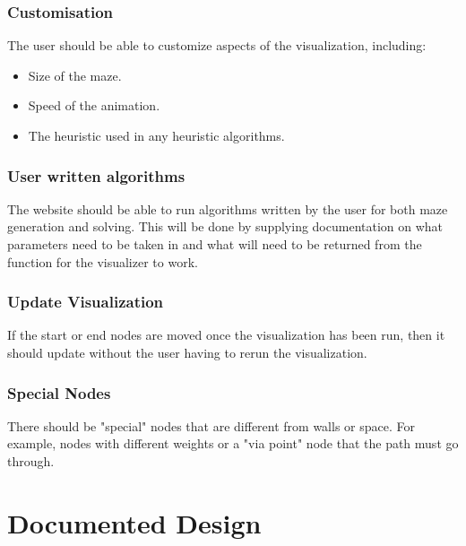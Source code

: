 \documentclass{article}
\begin{document}
\subsubsection{Customisation}
The user should be able to customize aspects of the visualization, including:
\begin{itemize}
    \item Size of the maze.
    \item Speed of the animation.
    \item The heuristic used in any heuristic algorithms.
\end{itemize}

\subsubsection{User written algorithms}
The website should be able to run algorithms written by the user for both maze generation and solving. This will be done by supplying documentation on what parameters need to be taken in and what will need to be returned from the function for the visualizer to work.

\subsubsection{Update Visualization}
If the start or end nodes are moved once the visualization has been run, then it should update without the user having to rerun the visualization.

\subsubsection{Special Nodes}
There should be "special" nodes that are different from walls or space. For example, nodes with different weights or a "via point" node that the path must go through.

\section{Documented Design}
\end{document}
